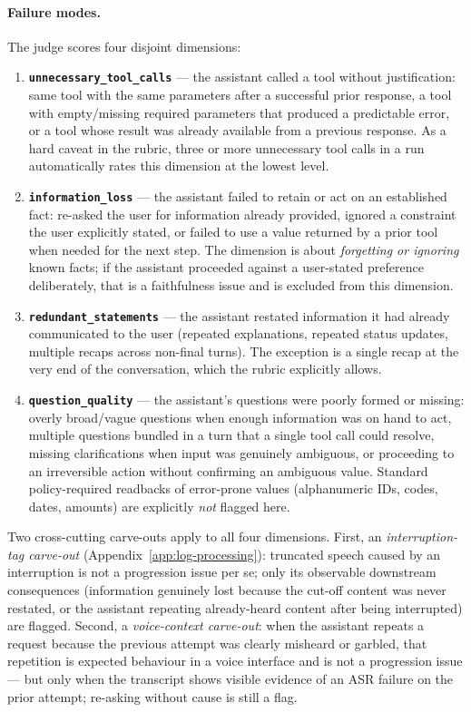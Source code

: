 \paragraph{Failure modes.} The judge scores four disjoint dimensions:
\begin{enumerate}
    \item \textbf{\texttt{unnecessary\_tool\_calls}} --- the assistant called a tool without justification: same tool with the same parameters after a successful prior response, a tool with empty/missing required parameters that produced a predictable error, or a tool whose result was already available from a previous response. As a hard caveat in the rubric, three or more unnecessary tool calls in a run automatically rates this dimension at the lowest level.
    \item \textbf{\texttt{information\_loss}} --- the assistant failed to retain or act on an established fact: re-asked the user for information already provided, ignored a constraint the user explicitly stated, or failed to use a value returned by a prior tool when needed for the next step. The dimension is about \emph{forgetting or ignoring} known facts; if the assistant proceeded against a user-stated preference deliberately, that is a faithfulness issue and is excluded from this dimension.
    \item \textbf{\texttt{redundant\_statements}} --- the assistant restated information it had already communicated to the user (repeated explanations, repeated status updates, multiple recaps across non-final turns). The exception is a single recap at the very end of the conversation, which the rubric explicitly allows.
    \item \textbf{\texttt{question\_quality}} --- the assistant's questions were poorly formed or missing: overly broad/vague questions when enough information was on hand to act, multiple questions bundled in a turn that a single tool call could resolve, missing clarifications when input was genuinely ambiguous, or proceeding to an irreversible action without confirming an ambiguous value. Standard policy-required readbacks of error-prone values (alphanumeric IDs, codes, dates, amounts) are explicitly \emph{not} flagged here.
\end{enumerate}
Two cross-cutting carve-outs apply to all four dimensions. First, an \emph{interruption-tag carve-out} (Appendix~\ref{app:log-processing}): truncated speech caused by an interruption is not a progression issue per se; only its observable downstream consequences (information genuinely lost because the cut-off content was never restated, or the assistant repeating already-heard content after being interrupted) are flagged. Second, a \emph{voice-context carve-out}: when the assistant repeats a request because the previous attempt was clearly misheard or garbled, that repetition is expected behaviour in a voice interface and is not a progression issue --- but only when the transcript shows visible evidence of an ASR failure on the prior attempt; re-asking without cause is still a flag.

